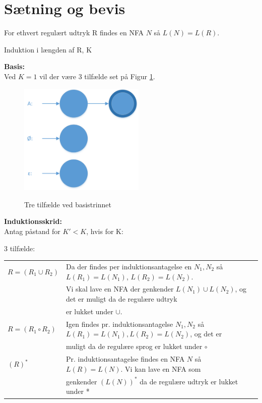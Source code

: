 \documentclass[a4paper,10pt,article]{memoir}
\begin{document}
\section{Sætning og bevis}
\begin{saetning}{For ethvert regulært udtryk R findes en NFA $N$ så $L(N)=L(R)$.}\end{saetning}
\begin{bevis}

Induktion i længden af R, K

\textbf{Basis:}\\
Ved $K=1$ vil der være 3 tilfælde set på Figur \ref{fig:fig1}.
\begin{figure}[h]%
\includegraphics[width=60mm]{Fig1x.png}
\label{fig:fig1}
\caption{Tre tilfælde ved basistrinnet}
\end{figure}

\textbf{Induktionsskrid:}\\
Antag påstand for $K'<K$, hvis for K:


\begin{table}[h]%
    3 tilfælde:

\begin{tabular}{|l|l|}
        \hline
        $R = (R_1 \cup R_2)$ & Da der findes per induktionsantagelse en $N_1, N_2$ så $L(R_1)=L(N_1)$, $L(R_2)=L(N_2)$. \\
	~ & Vi skal lave en NFA der genkender $L(N_1) \cup L(N_2)$, og det er muligt da de regulære udtryk \\
	~ &  er lukket under $\cup$. \\ 
        $R = (R_1 \circ R_2)$ & Igen findes pr. induktionsantagelse $N_1, N_2$ så $L(R_1) = L(N_1), L(R_2)=L(N_2)$, og det er\\
	~ &  muligt da de regulære sprog er lukket under $\circ$  \\ 
        $(R)^*$ & Pr. induktionsantagelse findes en NFA $N$ så $L(R)=L(N)$. Vi kan lave en NFA som \\
	~&genkender $(L(N))^*$ da de regulære udtryk er lukket under * \\
        \hline
    \end{tabular}
\end{table}

\end{bevis}
\end{document}

